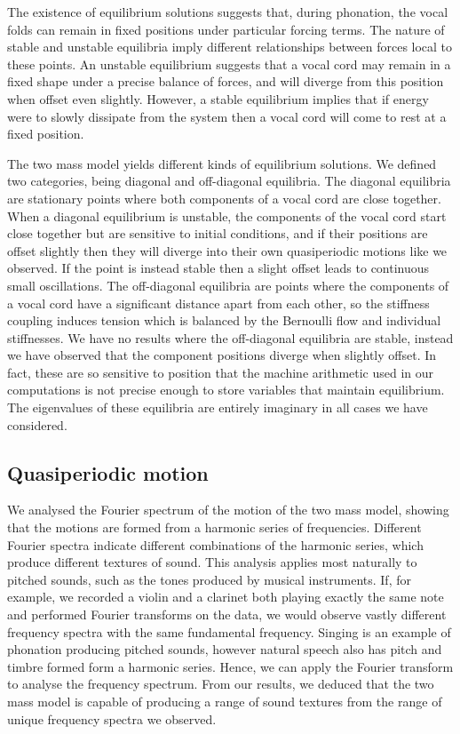 \documentclass{report}
\begin{document}
The existence of equilibrium solutions suggests that, during phonation, the vocal folds can remain in fixed positions under particular forcing terms.
The nature of stable and unstable equilibria imply different relationships between forces local to these points.
An unstable equilibrium suggests that a vocal cord may remain in a fixed shape under a precise balance of forces,
and will diverge from this position when offset even slightly.
However, a stable equilibrium implies that if energy were to slowly dissipate from the system then a vocal cord will come to rest at a fixed position.

The two mass model yields different kinds of equilibrium solutions.
We defined two categories, being diagonal and off-diagonal equilibria.
The diagonal equilibria are stationary points where both components of a vocal cord are close together.
When a diagonal equilibrium is unstable,
the components of the vocal cord start close together but are sensitive to initial conditions,
and if their positions are offset slightly then they will diverge into their own quasiperiodic motions like we observed.
If the point is instead stable then a slight offset leads to continuous small oscillations.
The off-diagonal equilibria are points where the components of a vocal cord have a significant distance apart from each other, so the stiffness coupling induces tension which is balanced by the Bernoulli flow and individual stiffnesses.
We have no results where the off-diagonal equilibria are stable,
instead we have observed that the component positions diverge when slightly offset.
In fact, these are so sensitive to position that the machine arithmetic used in our computations is not precise enough to store variables that maintain equilibrium.
The eigenvalues of these equilibria are entirely imaginary in all cases we have considered.

\subsection{Quasiperiodic motion}

We analysed the Fourier spectrum of the motion of the two mass model,
showing that the motions are formed from a harmonic series of frequencies.
Different Fourier spectra indicate different combinations of the harmonic series,
which produce different textures of sound.
This analysis applies most naturally to pitched sounds, such as the tones produced by musical instruments.
If, for example, we recorded a violin and a clarinet both playing exactly the same note and performed Fourier transforms on the data,
we would observe vastly different frequency spectra with the same fundamental frequency.
Singing is an example of phonation producing pitched sounds,
however natural speech also has pitch and timbre formed form a harmonic series.
Hence, we can apply the Fourier transform to analyse the frequency spectrum.
From our results, we deduced that the two mass model is capable of producing a range of sound textures from the range of unique frequency spectra we observed.
\end{document}
